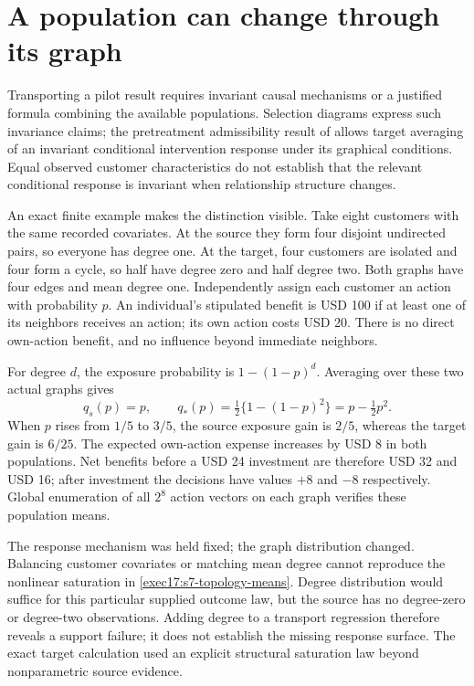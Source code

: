 \section{A population can change through its graph}
\label{exec17:s7-topology}

Transporting a pilot result requires invariant causal mechanisms or a justified
formula combining the available populations. Selection diagrams express such
invariance claims; the pretreatment admissibility result of
\citet[Theorem 2 and Corollary 1]{pearltransport2014} allows target averaging of
an invariant conditional intervention response under its graphical conditions.
Equal observed customer characteristics do not establish that the relevant
conditional response is invariant when relationship structure changes.

An exact finite example makes the distinction visible. Take eight customers
with the same recorded covariates. At the source they form four disjoint
undirected pairs, so everyone has degree one. At the target, four customers
are isolated and four form a cycle, so half have degree zero and half degree
two. Both graphs have four edges and mean degree one. Independently assign
each customer an action with probability $p$. An individual's stipulated
benefit is USD 100 if at least one of its neighbors receives an action; its
own action costs USD 20. There is no direct own-action benefit, and no
influence beyond immediate neighbors.

For degree $d$, the exposure probability is $1-(1-p)^d$. Averaging over these
two actual graphs gives
\begin{equation}
 q_s(p)=p,\qquad q_*(p)=\tfrac12\{1-(1-p)^2\}
                    =p-\tfrac12p^2.
 \label{exec17:s7-topology-means}
\end{equation}
When $p$ rises from $1/5$ to $3/5$, the source exposure gain is $2/5$,
whereas the target gain is $6/25$. The expected own-action expense increases
by USD 8 in both populations. Net benefits before a USD 24 investment are
therefore USD 32 and USD 16; after investment the decisions have values
$+8$ and $-8$ respectively. Global enumeration of all $2^8$ action vectors
on each graph verifies these population means.~\citep{exec17_s7_math}

The response mechanism was held fixed; the graph distribution changed.
Balancing customer covariates or matching mean degree cannot reproduce the
nonlinear saturation in \eqref{exec17:s7-topology-means}. Degree distribution
would suffice for this particular supplied outcome law, but the source has
no degree-zero or degree-two observations. Adding degree to a transport
regression therefore reveals a support failure; it does not establish the
missing response surface. The exact target calculation used an explicit
structural saturation law beyond nonparametric source evidence.

